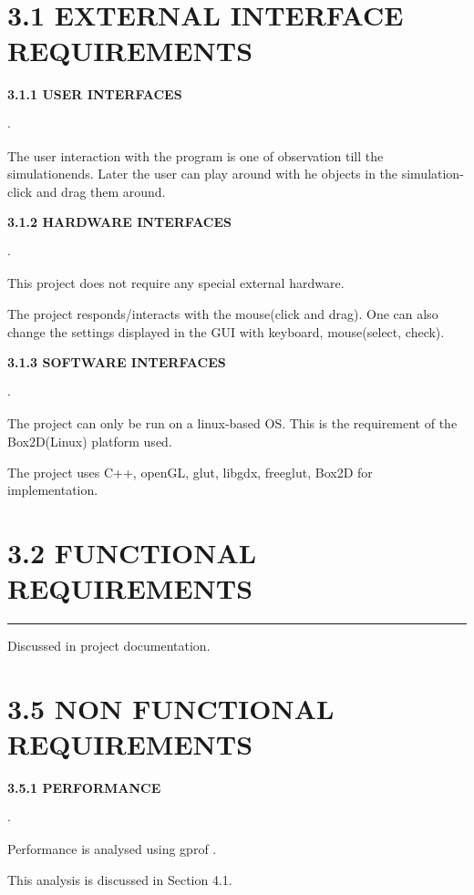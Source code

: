 \documentclass{report}
\begin{document}
\section*{3.1 EXTERNAL INTERFACE REQUIREMENTS}
\large \textbf{3.1.1 USER INTERFACES}
\begin{list}{$\cdot$}{\setlength{\leftmargin}{0em}}
\item The user interaction with the program is one of observation till the simulationends. Later the user can play around with he objects in the simulation- click and drag them around.
\end{list}

\large \textbf{3.1.2 HARDWARE INTERFACES}
\begin{list}{$\cdot$}{\setlength{\leftmargin}{0em}}
\item This project does not require any special external hardware.
\item The project responds/interacts with the mouse(click and drag).
One can also change the settings displayed in the GUI with keyboard, mouse(select, check).
\end{list}

\large \textbf{3.1.3 SOFTWARE INTERFACES}
\begin{list}{$\cdot$}{\setlength{\leftmargin}{0em}}
\item The project can only be run on a linux-based OS. This is the requirement of the Box2D(Linux) platform used.
\item The project uses C++, openGL, glut, libgdx, freeglut, Box2D for implementation.
\end{list}

\section*{3.2 FUNCTIONAL REQUIREMENTS}
\hrule \large Discussed in project documentation.

\section*{3.5 NON FUNCTIONAL REQUIREMENTS}

\large \textbf{3.5.1 PERFORMANCE}
\begin{list}{$\cdot$}{\setlength{\leftmargin}{0em}}
\item Performance is analysed using gprof \cite{gprof}.
\item This analysis is discussed in Section 4.1. 
\end{list}
\end{document}
